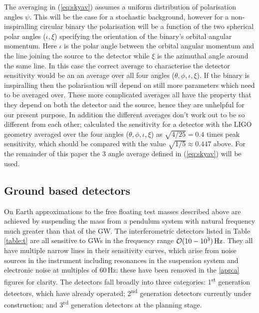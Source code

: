 The averaging in (\ref{eq:skyav}) assumes a uniform distribution of polarisation angles $\psi$. This will be the case for a stochastic background, however for a non-inspiralling circular binary the polarisation will be a function of the two spherical polar angles ($\iota,\xi$) specifying the orientation of the binary's orbital angular momentum. Here $\iota$ is the polar angle between the orbital angular momentum and the line joining the source to the detector while $\xi$ is the azimuthal angle around the same line. In this case the correct average to characterise the detector sensitivity would be an an average over all four angles ($\theta,\phi,\iota,\xi$). If the binary is inspiralling then the polarisation will depend on still more parameters which need to be averaged over. These more complicated averages all have the property that they depend on both the detector and the source, hence they are unhelpful for our present purpose. In addition the different averages don't work out to be so different from each other; \cite{1993PhRvD..47.2198F} calculated the sensitivity for a detector with the LIGO geometry averaged over the four angles ($\theta,\phi,\iota,\xi$) as $\sqrt{4/25}=0.4$ times peak sensitivity, which should be compared with the value $\sqrt{1/5}\approx 0.447$ above. For the remainder of this paper the 3 angle average defined in (\ref{eq:skyav}) will be used.

\subsection{Ground based detectors}\label{sec:ground}
On Earth approximations to the free floating test masses described above are achieved by suspending the mass from a pendulum system with natural frequency much greater than that of the GW. The interferometric detectors listed in Table \ref{table:t} are all sensitive to GWs in the frequency range ${\cal{O}}(10-10^{3})\,\textrm{Hz}$. They all have multiple narrow lines in their sensitivity curves, which arise from noise sources in the instrument including resonances in the suspension system and electronic noise at multiples of $60\,\textrm{Hz}$: these have been removed in the \ref{app:a} figures for clarity. The detectors fall broadly into three categories: 1\textsuperscript{st} generation detectors, which have already operated; 2\textsuperscript{nd} generation detectors currently under construction; and 3\textsuperscript{rd} generation detectors at the planning stage. 


